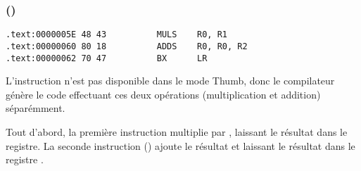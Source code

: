 \subsubsection{\OptimizingKeilVI (\ThumbMode)}

\begin{lstlisting}[label=ARM_leaf_example2,style=customasmARM]
.text:0000005E 48 43          MULS    R0, R1
.text:00000060 80 18          ADDS    R0, R0, R2
.text:00000062 70 47          BX      LR
\end{lstlisting}

L'instruction  n'est pas disponible dans le mode Thumb, donc le compilateur
génère le code effectuant ces deux opérations (multiplication et addition) séparémment.

Tout d'abord, la première instruction  multiplie  par , laissant
le résultat dans le registre.
La seconde instruction () ajoute le résultat et  laissant le résultat
dans le registre .

